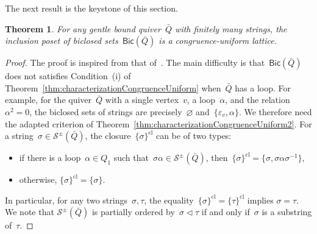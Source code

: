 \documentclass{amsart}
\newtheorem{theorem}{Theorem}[part]
\theoremstyle{definition}
\newcommand{\strings}{\mathcal{S}} %
\newcommand{\closure}[1]{#1^{\mathrm{cl}}} %
\newcommand{\Bicl}[1]{\mathsf{Bic}(#1)} %
\begin{document}
The next result is the keystone of this section.

\begin{theorem}
For any gentle bound quiver~$\bar Q$ with finitely many strings, the inclusion poset of biclosed sets~$\Bicl{\bar Q}$ is a congruence-uniform lattice.
\end{theorem}

\begin{proof}
The proof is inspired from that of~\cite[Thm.~6.5]{McConville}.
The main difficulty is that~$\Bicl{\bar Q}$ does not satisfies Condition~(i) of Theorem~\ref{thm:characterizationCongruenceUniform} when~$\bar Q$ has a loop.
For example, for the quiver~$\bar Q$ with a single vertex~$v$, a loop~$\alpha$, and the relation~$\alpha^2 = 0$, the biclosed sets of strings are precisely~$\varnothing$ and~$\{\varepsilon_v, \alpha\}$.
We therefore need the adapted criterion of Theorem~\ref{thm:characterizationCongruenceUniform2}.
For a string~$\sigma \in \strings^\pm(\bar Q)$, the closure~$\closure{\{\sigma\}}$ can be of two types:
\begin{itemize}
\item if there is a loop~$\alpha \in Q_1$ such that~$\sigma \alpha \in \strings^\pm(\bar Q)$, then~$\closure{\{\sigma\}} = \{\sigma, \sigma \alpha \sigma^{-1}\}$,
\item otherwise, $\closure{\{\sigma\}} = \{\sigma\}$.
\end{itemize}
In particular, for any two strings~$\sigma, \tau$, the equality~$\closure{\{\sigma\}}=\closure{\{\tau\}}$ implies $\sigma=\tau$.
We note that $\strings^\pm(\bar Q)$ is partially ordered by~$\sigma \vartriangleleft \tau$ if and only if~$\sigma$ is a substring of~$\tau$.


\end{proof}
\end{document}
